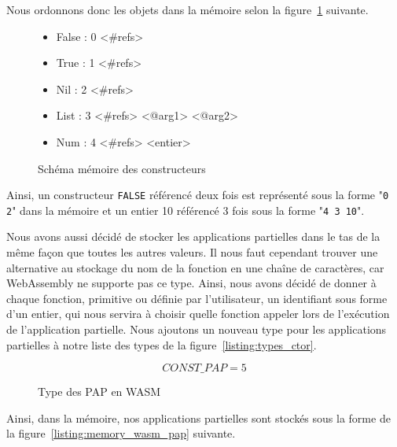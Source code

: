 \documentclass{rapportECL}
\begin{document}
Nous ordonnons donc les objets dans la mémoire selon la figure~\ref{listing:memory_wasm} suivante.

\begin{figure}[H]
	\begin{itemize}
		\item False : 0 <\#refs>
		\item True  : 1 <\#refs>
		\item Nil   : 2 <\#refs>
		\item List  : 3 <\#refs> <@arg1> <@arg2>
		\item Num   : 4 <\#refs> <entier>
	\end{itemize}
	\caption{Schéma mémoire des constructeurs}
	\label{listing:memory_wasm}
\end{figure}

Ainsi, un constructeur \verb|FALSE| référencé deux fois est représenté sous la forme "\verb|0 2|" dans la mémoire et un entier 10 
référencé 3 fois sous la forme "\verb|4 3 10|".

\bigskip

Nous avons aussi décidé de stocker les applications partielles dans le tas de la même façon que toutes les autres valeurs.
Il nous faut cependant trouver une alternative au stockage du nom de la fonction en une chaîne de caractères, car WebAssembly ne supporte pas ce type. 
Ainsi, nous avons décidé de donner à chaque fonction, primitive ou définie par l'utilisateur, un identifiant sous forme d'un entier, qui nous servira à choisir quelle fonction appeler lors de l'exécution de l'application partielle.
Nous ajoutons un nouveau type pour les applications partielles à notre liste des types de la figure~\ref{listing:types_ctor}.


\begin{figure}[H]
	\begin{equation*}
	CONST\_PAP = 5
	\end{equation*}
	\caption{Type des PAP en WASM}
	\label{listing:types_pap_wasm}
	\end{figure}
	\FloatBarrier 

Ainsi, dans la mémoire, nos applications partielles sont stockés sous la forme de la figure~\ref{listing:memory_wasm_pap} suivante.
\end{document}
